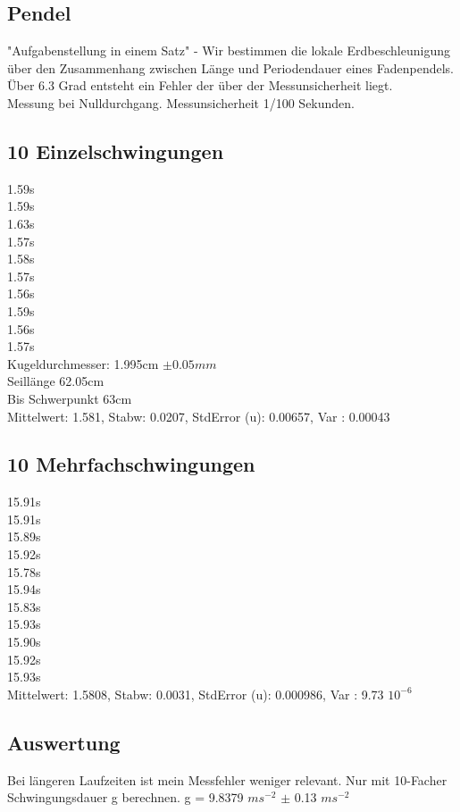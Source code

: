 \documentclass[12pt,a4paper]{article}
\begin{document}
\begin{multicols}{2}
\section{Pendel}
"Aufgabenstellung in einem Satz" - Wir bestimmen die lokale Erdbeschleunigung über den Zusammenhang zwischen Länge und Periodendauer eines Fadenpendels.\\

Über 6.3 Grad entsteht ein Fehler der über der Messunsicherheit liegt. \\
Messung bei Nulldurchgang.
Messunsicherheit 1/100 Sekunden.

\subsection{10 Einzelschwingungen}
1.59s\\
1.59s\\
1.63s\\
1.57s\\
1.58s\\
1.57s\\
1.56s\\
1.59s\\
1.56s\\
1.57s\\
Kugeldurchmesser: 1.995cm $\pm 0.05mm$\\
Seillänge 62.05cm\\
Bis Schwerpunkt 63cm\\
Mittelwert: 1.581, Stabw: 0.0207, StdError (u): 0.00657, Var : 0.00043
\subsection{10 Mehrfachschwingungen}
15.91s\\
15.91s\\
15.89s\\
15.92s\\
15.78s\\
15.94s\\
15.83s\\
15.93s\\
15.90s\\
15.92s\\
15.93s\\
Mittelwert: 1.5808, Stabw: 0.0031, StdError (u): 0.000986, Var : 9.73 $10^{-6}$
\subsection{Auswertung}
Bei längeren Laufzeiten ist mein Messfehler weniger relevant.
Nur mit 10-Facher Schwingungsdauer g berechnen.
g = 9.8379 $ms^{-2}$ $\pm $ 0.13 $ms^{-2}$


\end{multicols}
\end{document}
